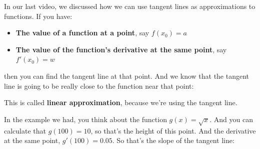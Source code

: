 \documentclass[pdftex, brazil, 12pt, twoside]{article}
\begin{document}
In our last video, we discussed how we can use tangent lines
as approximations to functions.
If you have:
\begin{itemize}[noitemsep]
\item \textbf{The value of a function at a point}, say $f(x_0) = a$
\item \textbf{The value of the function's derivative at the same point}, say $f'(x_0) = w$
\end{itemize}
then you can find the tangent line at that point.
And we know that the tangent line
is going to be really close to the function near that point:

\begin{figure}[H]
  \begin{center}
  \end{center}
\end{figure}

This is called \textbf{linear approximation},
because we're using the tangent line.

In the example we had, you think about the function
$g(x) = \sqrt{x}$.
And you can calculate that $g(100) = 10$,
so that's the height of this point.
And the derivative at the same point, $g'(100)= 0.05$.
So that's the slope of the tangent line:

\begin{figure}[H]
  \begin{center}
  \end{center}
\end{figure}
\end{document}
